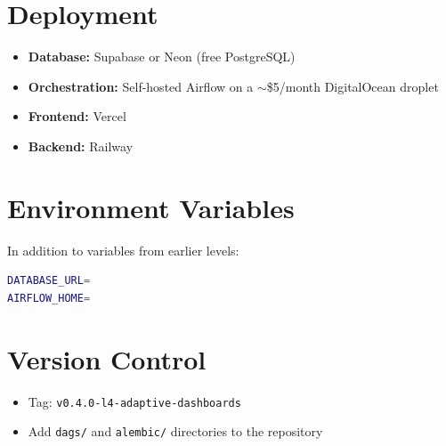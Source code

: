 \documentclass{article}
\begin{document}
\section{Deployment}

\begin{itemize}[leftmargin=*]
  \item \textbf{Database:} Supabase or Neon (free PostgreSQL)
  \item \textbf{Orchestration:} Self-hosted Airflow on a $\sim$\$5/month DigitalOcean droplet
  \item \textbf{Frontend:} Vercel
  \item \textbf{Backend:} Railway
\end{itemize}

\section{Environment Variables}

In addition to variables from earlier levels:

\begin{lstlisting}[language=bash]
DATABASE_URL=
AIRFLOW_HOME=
\end{lstlisting}

\section{Version Control}

\begin{itemize}[leftmargin=*]
  \item Tag: \texttt{v0.4.0-l4-adaptive-dashboards}
  \item Add \texttt{dags/} and \texttt{alembic/} directories to the repository
\end{itemize}
\end{document}
